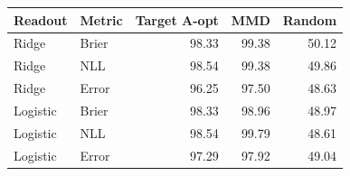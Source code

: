 \begin{tabular}{llrrr}
\toprule
Readout & Metric & Target A-opt & MMD & Random\\
\midrule
Ridge & Brier & 98.33 & 99.38 & 50.12\\
Ridge & NLL & 98.54 & 99.38 & 49.86\\
Ridge & Error & 96.25 & 97.50 & 48.63\\
Logistic & Brier & 98.33 & 98.96 & 48.97\\
Logistic & NLL & 98.54 & 99.79 & 48.61\\
Logistic & Error & 97.29 & 97.92 & 49.04\\
\bottomrule
\end{tabular}
